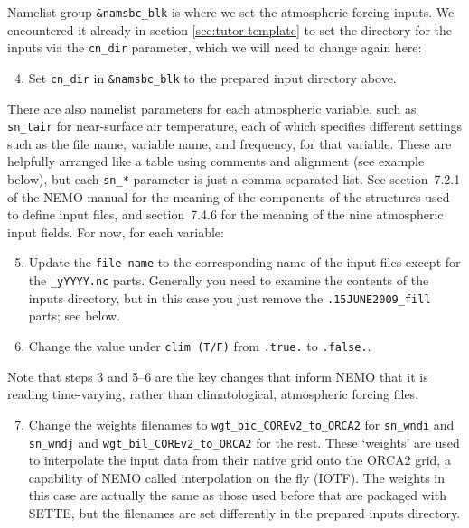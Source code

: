 Namelist group \texttt{\&namsbc\_blk} is where we set the atmospheric forcing inputs.
We encountered it already in section \ref{sec:tutor-template} to set the directory for the inputs via the \verb|cn_dir| parameter, which we will need to change again here:
\begin{enumerate}\setcounter{enumi}{3}
    \item Set \verb|cn_dir| in \verb|&namsbc_blk| to the prepared input directory above.
\end{enumerate}
There are also namelist parameters for each atmospheric variable, such as \verb|sn_tair| for near-surface air temperature, each of which specifies different settings such as the file name, variable name, and frequency, for that variable.
These are helpfully arranged like a table using comments and alignment (see example below), but each \verb|sn_*| parameter is just a comma-separated list.
See section~\mbox{7.2.1} of the NEMO manual for the meaning of the components of the structures used to define input files, and section~\mbox{7.4.6} for the meaning of the nine atmospheric input fields.
For now, for each variable:

\begin{enumerate}\setcounter{enumi}{4}
    \item Update the \verb|file name| to the corresponding name of the input files except for the \verb|_yYYYY.nc| parts.
        Generally you need to examine the contents of the inputs directory, but in this case you just remove the \verb|.15JUNE2009_fill| parts; see below.
    \item Change the value under \verb|clim (T/F)| from \verb|.true.| to \verb|.false.|.
\end{enumerate}

Note that steps 3 and \mbox{5--6} are the key changes that inform NEMO that it is reading time-varying, rather than climatological, atmospheric forcing files.

\begin{enumerate}\setcounter{enumi}{6}
    \item Change the weights filenames to \verb|wgt_bic_COREv2_to_ORCA2| for \verb|sn_wndi| and \verb|sn_wndj| and \verb|wgt_bil_COREv2_to_ORCA2| for the rest.
        These `weights' are used to interpolate the input data from their native grid onto the ORCA2 grid, a capability of NEMO called interpolation on the fly (IOTF).
        The weights in this case are actually the same as those used before that are packaged with SETTE, but the filenames are set differently in the prepared inputs directory.
\end{enumerate}

